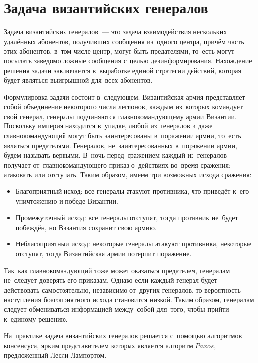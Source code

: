 \section{Задача византийских генералов}\label{sec:2}
Задача византийских генералов~--- это задача взаимодействия нескольких удалённых абонентов, получивших сообщения из~одного центра, причём часть этих абонентов, в~том числе центр, могут быть предателями, то~есть могут посылать заведомо ложные сообщения с~целью дезинформирования. Нахождение решения задачи заключается в~выработке единой стратегии действий, которая будет являться выигрышной для~всех абонентов.

Формулировка задачи состоит в~следующем. Византийская армия представляет собой объединение некоторого числа легионов, каждым из~которых командует свой генерал, генералы подчиняются главнокомандующему армии Византии. Поскольку империя находится в~упадке, любой из~генералов и даже главнокомандующий могут быть заинтересованы в~поражении армии, то~есть являться предателями. Генералов, не~заинтересованных в~поражении армии, будем называть верными. В~ночь перед~сражением каждый из~генералов получает от~главнокомандующего приказ о~действиях во~время сражения: атаковать или отступать. Таким образом, имеем три возможных исхода сражения:
\begin{itemize}
	\item Благоприятный исход: все генералы атакуют противника, что приведёт к~его уничтожению и победе Византии.
	\item Промежуточный исход: все генералы отступят, тогда противник не~будет побеждён, но Византия сохранит свою армию.
	\item Неблагоприятный исход: некоторые генералы атакуют противника, некоторые отступят, тогда Византийская армии потерпит поражение.
\end{itemize}

Так~как главнокомандующий тоже может оказаться предателем, генералам не~следует доверять его приказам. Однако если каждый генерал будет действовать самостоятельно, независимо от~других генералов, то вероятность наступления боагоприятного исхода становится низкой. Таким образом, генералам следует обмениваться информацией между~собой для~того, чтобы прийти к~единому решению.

На~практике задача византийских генералов решается с~помощью алгоритмов консенсуса, ярким представителем которых является алгоритм $Paxos$, предложенный Лесли Лампортом.

